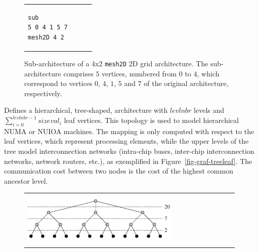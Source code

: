 \begin{itemize}
\begin{figure}[hbt]
\begin{tabular}{p{0.69\linewidth}@{}p{0.29\linewidth}}
\begin{center}
{\begin{verbatim}
sub
5 0 4 1 5 7
mesh2D 4 2
\end{verbatim}
}
\end{center}
\end{tabular}
\caption{Sub-architecture of a 4x2 \texttt{mesh2D} 2D grid
  architecture. The sub-architecture comprises $5$ vertices, numbered
  from $0$ to $4$, which correspond to vertices $0$, $4$, $1$, $5$ and
  $7$ of the original architecture, respectively.}
\label{fig-file-targetsub}
\end{figure}
Defines a hierarchical, tree-shaped, architecture with $\mathit{levlnbr}$
levels and $\sum_{i=0}^{\mathit{levlnbr}-1}\mathit{sizeval}_i$
leaf vertices. This topology is used to model hierarchical NUMA or NUIOA
machines. The mapping is only computed with respect to the leaf
vertices, which represent processing elements, while the upper levels of
the tree model interconnection networks (intra-chip buses, inter-chip
interconnection networks, network routers, etc.), as exemplified in
Figure~\ref{fig-graf-treeleaf}. The communication cost between two
nodes is the cost of the highest common ancestor level.
\begin{figure}[hbt]
\begin{tabular}{p{0.69\linewidth}@{}p{0.29\linewidth}}
\begin{center}
\parbox[t]{0.9\linewidth}{\vspace{0pt}\includegraphics[width=0.95\linewidth]{s_f_lea.eps}}
\end{center}
&
\begin{center}
{\renewcommand{\baselinestretch}{1.05}
\footnotesize\tt
\begin{verbatim}



\end{verbatim}}
\end{center}
\end{tabular}
\end{figure}
\end{itemize}
